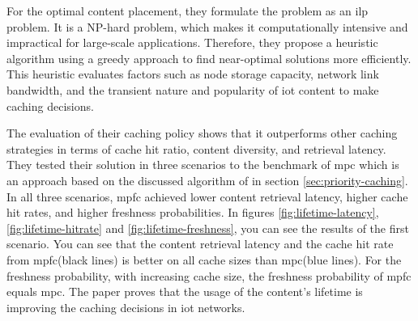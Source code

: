 \documentclass[conference]{IEEEtran}
\begin{document}
 	For the optimal content placement, they formulate the problem as an \ac{ilp} problem. It is a NP-hard problem, which makes it computationally intensive and impractical for large-scale applications. Therefore, they propose a heuristic algorithm using a greedy approach to find near-optimal solutions more efficiently. This heuristic evaluates factors such as node storage capacity, network link bandwidth, and the transient nature and popularity of \ac{iot} content to make caching decisions.

 	The evaluation of their caching policy shows that it outperforms other caching strategies in terms of cache hit ratio, content diversity, and retrieval latency. They tested their solution in three scenarios to the benchmark of \ac{mpc} which is an approach based on the discussed algorithm of \cite{caching-8} in section \ref{sec:priority-caching}. In all three scenarios, \ac{mpfc} achieved lower content retrieval latency, higher cache hit rates, and higher freshness probabilities. In figures \ref{fig:lifetime-latency}, \ref{fig:lifetime-hitrate} and \ref{fig:lifetime-freshness}, you can see the results of the first scenario. You can see that the content retrieval latency and the cache hit rate from \ac{mpfc}(black lines) is better on all cache sizes than \ac{mpc}(blue lines). For the freshness probability, with increasing cache size, the freshness probability of \ac{mpfc} equals \ac{mpc}. The paper proves that the usage of the content's lifetime is improving the caching decisions in \ac{iot} networks.
\end{document}
